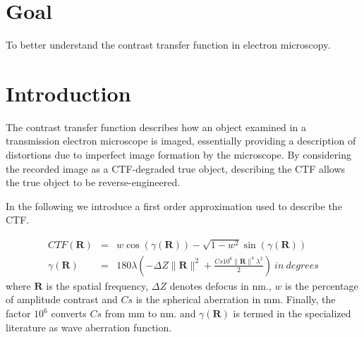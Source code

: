 \documentclass[12pt]{article} %
\begin{document}

\tableofcontents %

\newpage %


\section {Goal}

To better understand the contrast transfer function in electron microscopy.


\section{Introduction} %

The contrast transfer function describes how an object examined in a transmission electron microscope is imaged, essentially providing a description of distortions due to imperfect image formation by the microscope. By considering the recorded image as a CTF-degraded true object, describing the CTF allows the true object to be reverse-engineered. 

 In the following we introduce a first order approximation used to describe the CTF.


\begin{eqnarray*}
    CTF(\mathbf{R})& = &w \cos(\gamma(\mathbf{R})) - \sqrt{1-w^2}\sin(\gamma(\mathbf{R}))\\
   \gamma (\mathbf{R})& = & 180\lambda(-\Delta Z \|\mathbf{R}\| ^2 + \frac{Cs10^6\|\mathbf{R}\|^4\lambda^2}{2})\ in\ degrees
\end{eqnarray*}
where $\mathbf{R}$ is the spatial frequency, $\Delta Z$ denotes defocus in nm.,  $w$ is the percentage of amplitude contrast and $Cs$ is the spherical aberration in mm. Finally, the factor $10^6$ converts $Cs$ from mm to nm. and $\gamma (\mathbf{R})$ is termed in the specialized literature as wave aberration function.\\
\end{document}
